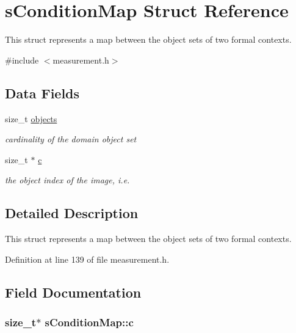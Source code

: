 \hypertarget{structsConditionMap}{\section{s\-Condition\-Map \-Struct \-Reference}
\label{structsConditionMap}
}


\-This struct represents a map between the object sets of two formal contexts.  




{\ttfamily \#include $<$measurement.\-h$>$}

\subsection*{\-Data \-Fields}
\begin{DoxyCompactItemize}
\item 
size\-\_\-t \hyperlink{structsConditionMap_aba0e3734a3c3c6de4f39d9a6c72f3cca}{objects}
\begin{DoxyCompactList}\small\item\em cardinality of the domain object set \end{DoxyCompactList}\item 
size\-\_\-t $\ast$ \hyperlink{structsConditionMap_a8fba8e129aa41cc4fd2f1898e83c2f28}{c}
\begin{DoxyCompactList}\small\item\em the object index of the image, i.\-e. \end{DoxyCompactList}\end{DoxyCompactItemize}


\subsection{\-Detailed \-Description}
\-This struct represents a map between the object sets of two formal contexts. 

\-Definition at line 139 of file measurement.\-h.



\subsection{\-Field \-Documentation}
\hypertarget{structsConditionMap_a8fba8e129aa41cc4fd2f1898e83c2f28}{
\subsubsection[{c}]{\setlength{\rightskip}{0pt plus 5cm}size\-\_\-t$\ast$ {\bf s\-Condition\-Map\-::c}}}\label{structsConditionMap_a8fba8e129aa41cc4fd2f1898e83c2f28}


